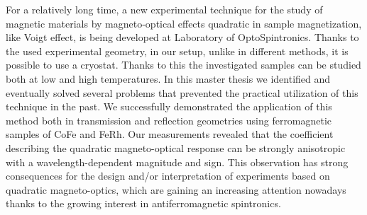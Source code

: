 \documentclass[12pt]{report}
\begin{document}
For a relatively long time, a new experimental technique for the study of magnetic materials by magneto-optical effects quadratic in sample magnetization, like Voigt effect, is being developed at Laboratory of OptoSpintronics. Thanks to the used experimental geometry, in our setup, unlike in different methods, it is possible to use a cryostat. Thanks to this the investigated samples can be studied both at low and high temperatures. In this master thesis we identified and eventually solved several problems that prevented the practical utilization of this technique in the past. We successfully demonstrated the application of this method both in transmission and reflection geometries using ferromagnetic samples of CoFe and FeRh. Our measurements revealed that the coefficient describing the quadratic magneto-optical response can be strongly anisotropic with a wavelength-dependent magnitude and sign. This observation has strong consequences for the design and/or interpretation of experiments based on quadratic magneto-optics, which are gaining an increasing attention nowadays thanks to the growing interest in antiferromagnetic spintronics.
\end{document}
